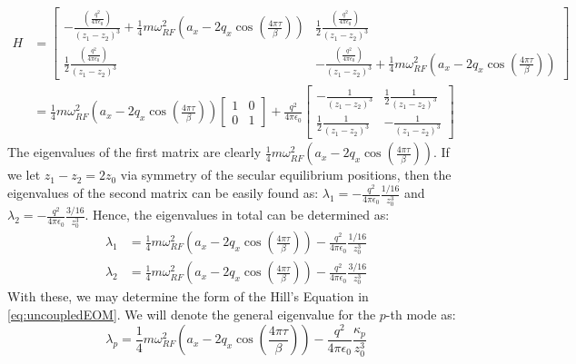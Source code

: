 \documentclass{article}
\begin{document}
\begin{align}
H & = \begin{bmatrix} -\frac{\left( \frac{q^2}{4 \pi \epsilon_0} \right)}{(z_1 - z_2)^3} + \frac{1}{4} m \omega_{RF}^2 \left( a_x - 2 q_x \cos(\frac{4 \pi \tau}{\beta}) \right) & \frac{1}{2} \frac{\left( \frac{q^2}{4 \pi \epsilon_0} \right)}{(z_1 - z_2)^3} \\ \frac{1}{2} \frac{\left( \frac{q^2}{4 \pi \epsilon_0} \right)}{(z_1 - z_2)^3} & -\frac{\left( \frac{q^2}{4 \pi \epsilon_0} \right)}{(z_1 - z_2)^3} + \frac{1}{4} m \omega_{RF}^2 \left(a_x - 2 q_x \cos(\frac{4 \pi \tau}{\beta}) \right) \end{bmatrix} \\
& = \frac{1}{4} m \omega_{RF}^2 \left( a_x - 2 q_x \cos(\frac{4 \pi \tau}{\beta}) \right) \begin{bmatrix} 1 & 0 \\ 0 & 1 \end{bmatrix} +  \frac{q^2}{4 \pi \epsilon_0} \begin{bmatrix} - \frac{1}{(z_1 - z_2)^3} & \frac{1}{2} \frac{1}{(z_1 - z_2)^3} \\ \frac{1}{2} \frac{1}{(z_1 - z_2)^3} & - \frac{1}{(z_1 - z_2)^3} \end{bmatrix}
\end{align}
The eigenvalues of the first matrix are clearly $\frac{1}{4} m \omega_{RF}^2 \left(a_x - 2 q_x \cos(\frac{4 \pi \tau}{\beta}) \right)$. If we let $z_1 - z_2 = 2 z_0$ via symmetry of the secular equilibrium positions, then the eigenvalues of the second matrix can be easily found as: $\lambda_1 = -  \frac{q^2}{4 \pi \epsilon_0} \frac{1/16}{z_0^3}$ and $\lambda_2 = -  \frac{q^2}{4 \pi \epsilon_0} \frac{3/16}{z_0^3}$. Hence, the eigenvalues in total can be determined as:
\begin{align}
\lambda_1 & = \frac{1}{4} m \omega_{RF}^2 \left( a_x - 2 q_x \cos(\frac{4 \pi \tau}{\beta}) \right) -  \frac{q^2}{4 \pi \epsilon_0} \frac{1/16}{z_0^3} \\
\lambda_2 & = \frac{1}{4} m \omega_{RF}^2 \left( a_x - 2 q_x \cos(\frac{4 \pi \tau}{\beta})\right) -  \frac{q^2}{4 \pi \epsilon_0} \frac{3/16}{z_0^3}
\end{align}
With these, we may determine the form of the Hill's Equation in \eqref{eq:uncoupledEOM}. We will denote the general eigenvalue for the $p$-th mode as:
\begin{equation}
\lambda_p = \frac{1}{4} m \omega_{RF}^2 \left(a_x - 2 q_x \cos(\frac{4 \pi \tau}{\beta}) \right) - \frac{q^2}{4 \pi \epsilon_0} \frac{\kappa_p}{z_0^3}
\end{equation}
\end{document}
